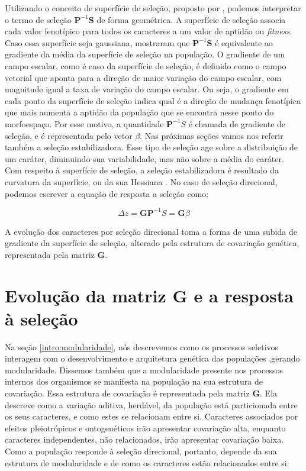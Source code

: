 Utilizando o conceito de superfície de seleção, proposto por
\cite{Wright1932}, podemos interpretar o termo de seleção
$\mathbf{P}^{-1}\mathbf{S}$ de forma geométrica.
A superfície de seleção associa cada valor fenotípico para todos os
caracteres a um valor de aptidão ou {\it fitness}.
Caso essa superfície seja gaussiana, \cite{Lande1983} mostraram que
$\mathbf{P}^{-1}\mathbf{S}$ é equivalente ao gradiente da média da
superfície de seleção na população.
O gradiente de um campo escalar, como é caso da superfície de seleção,
é definido como o campo vetorial que aponta para a direção de maior
variação do campo escalar, com magnitude igual a taxa de variação do
campo escalar.
Ou seja, o gradiente em cada ponto da superfície de seleção indica qual
é a direção de mudança fenotípica que mais aumenta a aptidão da
população que se encontra nesse ponto do morfoespaço.
Por esse motivo, a quantidade $\mathbf{P}^{-1}S$ é chamada
de gradiente de seleção, e é representada pelo vetor $\beta$.
Nas próximas seções vamos nos referir também a seleção estabilizadora.
Esse tipo de seleção age sobre a distribuição de um caráter, diminuindo
sua variabilidade, mas não sobre a média do caráter.
Com respeito à superfície de seleção, a seleção estabilizadora é
resultado da curvatura da superfície, ou da sua Hessiana
\citep{Lande1983}.
No caso de seleção direcional, podemos escrever a equação de resposta a
seleção como:

\begin{equation}
    \Delta z = \mathbf{GP}^{-1}S = \mathbf{G}\beta
    \label{landeZGBETA}
\end{equation}

A evolução dos caracteres por seleção direcional toma a forma de uma
subida de gradiente da superfície de seleção, alterado pela estrutura de
covariação genética, representada pela matriz $\mathbf{G}$.

\section{Evolução da matriz $\mathbf{G}$ e a resposta à seleção}\label{intro:matG}

Na seção \ref{intro:modularidade}, nós descrevemos como os processos
seletivos interagem com o desenvolvimento e arquitetura genética das
populações ,gerando modularidade.
Dissemos também que a modularidade presente nos processos internos dos
organismos se manifesta na população na sua estrutura de covariação.
Essa estrutura de covariação é representada pela matriz $\mathbf{G}$.
Ela descreve como a variação aditiva, herdável, da população está particionada entre os
seus caracteres, e como estes se relacionam entre si.
Caracteres associados por efeitos pleiotrópicos e ontogenéticos irão
apresentar covariação alta, enquanto caracteres independentes, não
relacionados, irão apresentar covariação baixa.
Como a população responde à seleção direcional, portanto, depende da sua estrutura
de modularidade e de como os caracteres estão relacionados entre si.

